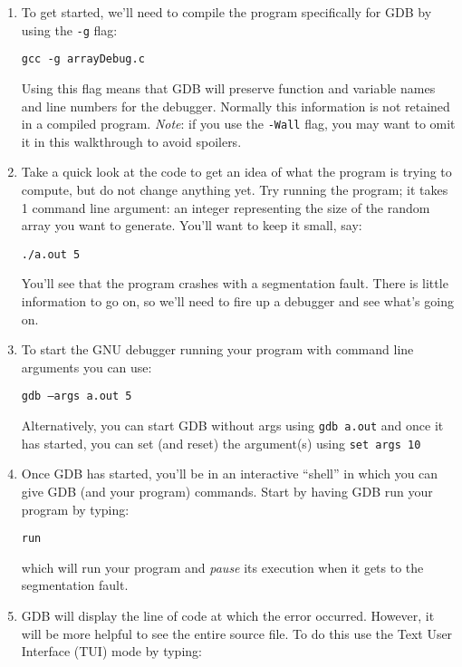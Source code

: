 \documentclass[12pt]{scrartcl}
\begin{document}
\begin{enumerate}
  \item To get started, we'll need to compile the program specifically for GDB
  by using the \texttt{-g} flag:

  \texttt{gcc -g arrayDebug.c}

  Using this flag means that GDB will preserve function and variable names
  and line numbers for the debugger.  Normally this information is not 
  retained in a compiled program.  \emph{Note}: if you use the 
  \texttt{-Wall} flag, you may want to omit it in this walkthrough
  to avoid spoilers.
  
  \item Take a quick look at the code to get an idea of what the program
  is trying to compute, but do not change anything yet.  Try running the 
  program; it takes 1 command line argument: an integer
  representing the size of the random array you want to generate.  You'll
  want to keep it small, say: 
  
  \texttt{./a.out 5}

  You'll see that the program crashes with a segmentation fault.  There is
  little information to go on, so we'll need to fire up a debugger and see
  what's going on.
  
  \item To start the GNU debugger running your program with command line arguments
  you can use:
  
  \texttt{gdb --args a.out 5}
  
  Alternatively, you can start GDB without args using \texttt{gdb a.out}
  and once it has started, you can set (and reset) the argument(s) using 
  \texttt{set args 10}

  \item Once GDB has started, you'll be in an interactive ``shell'' in which
  you can give GDB (and your program) commands.  Start by having GDB run your
  program by typing: 
  
  \texttt{run}
  
  which will run your program and \emph{pause} its execution when it gets to the
  segmentation fault.  
  
  \item GDB will display the line of code at which the error occurred.
  However, it will be more helpful to see the entire source file.  To do
  this use the Text User Interface (TUI) mode by typing:
  

\end{enumerate}
\end{document}
